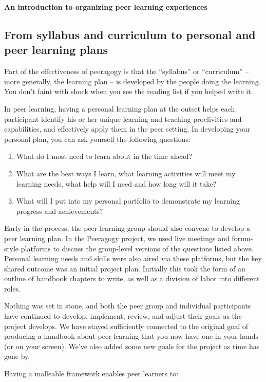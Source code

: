 \textbf{An introduction to organizing peer learning experiences}

\subsection{From syllabus and curriculum to personal and peer learning
plans}

Part of the effectiveness of peeragogy is that the ``syllabus'' or
``curriculum'' -- more generally, the learning plan -- is developed by
the people doing the learning. You don't faint with shock when you see
the reading list if you helped write it.

In peer learning, having a personal learning plan at the outset helps
each participant identify his or her unique learning and teaching
proclivities and capabilities, and effectively apply them in the peer
setting. In developing your personal plan, you can ask yourself the
following questions:

\begin{enumerate}
\item
  What do I most need to learn about in the time ahead?
\item
  What are the best ways I learn, what learning activities will meet my
  learning needs, what help will I need and how long will it take?
\item
  What will I put into my personal portfolio to demonstrate my learning
  progress and achievements?
\end{enumerate}
Early in the process, the peer-learning group should also convene to
develop a peer learning plan. In the Peeragogy project, we used live
meetings and forum-style platforms to discuss the group-level versions
of the questions listed above. Personal learning needs and skills were
also aired via these platforms, but the key shared outcome was an
initial project plan. Initially this took the form of an outline of
handbook chapters to write, as well as a division of labor into
different roles.

Nothing was set in stone, and both the peer group and individual
participants have continued to develop, implement, review, and adjust
their goals as the project develops. We have stayed sufficiently
connected to the original goal of producing a handbook about peer
learning that you now have one in your hands (or on your screen). We've
also added some new goals for the project as time has gone by.

Having a malleable framework enables peer learners to:

